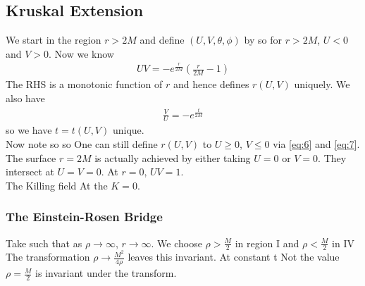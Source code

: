 \documentclass{article}
\begin{document}
\subsection{Kruskal Extension}
We start in the region $r>2M$ and define  $(U,V,\theta,\phi)$ by 
so for $r>2M$, $U<0$ and $V>0$. Now we know 
\begin{align}
\label{eq:6}
UV = -e^{\frac{r}{2M}}(\frac{r}{2M}-1)
\end{align}
The RHS is a monotonic function of $r$ and hence defines $r(U,V)$ uniquely. We also have 
\begin{align}
\label{eq:7}
\frac{V}{U} = -e^\frac{t}{2M}
\end{align}
so we have $t=t(U,V)$ unique. \\
Now note 
so 
so 
One can still define $r(U,V)$ to $U\geq0$, $V\leq0$ via \ref{eq:6} and \ref{eq:7}. The surface $r=2M$ is actually achieved by either taking $U=0$ or $V=0$. They intersect at $U=V=0$. At $r=0$, $UV=1$. \\
The Killing field
At the  $K=0$. 

\subsubsection*{The Einstein-Rosen Bridge}
Take 
such that as $\rho \to \infty $, $r \to \infty$. We choose $\rho>\frac{M}{2}$ in region I and $\rho < \frac{M}{2}$ in IV
The transformation $\rho \to \frac{M^2}{4\rho}$ leaves this invariant. At constant t 
Not the value $\rho=\frac{M}{2}$ is invariant under the transform. 
\end{document}
